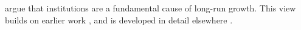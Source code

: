 \documentclass[11pt]{article}
\begin{document}
\textcite{acemoglu2012} argue that institutions are a fundamental cause
of long-run growth. This view builds on earlier work
\parencite{halljones1999}, and is developed in detail elsewhere
\parencite[see][chap.~2]{acemoglu2012}.

\printbibliography              %
\end{document}
